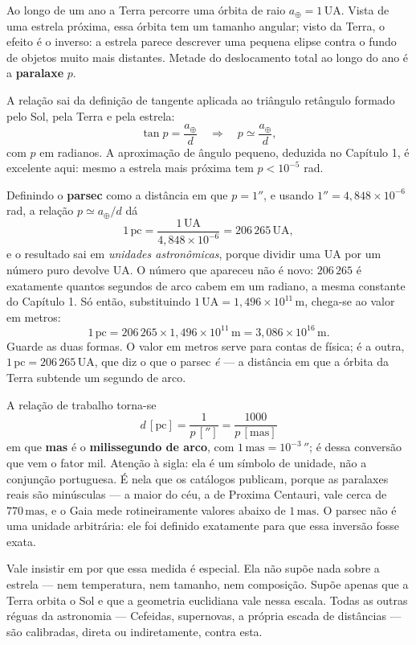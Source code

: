 \documentclass[11pt,a4paper]{article}
\begin{document}
Ao longo de um ano a Terra percorre uma órbita de raio $a_\oplus=1\,\mathrm{UA}$. Vista de uma estrela próxima, essa órbita tem um tamanho angular; visto da Terra, o efeito é o inverso: a estrela parece descrever uma pequena elipse contra o fundo de objetos muito mais distantes. Metade do deslocamento total ao longo do ano é a \textbf{paralaxe} $p$.

A relação sai da definição de tangente aplicada ao triângulo retângulo formado pelo Sol, pela Terra e pela estrela:
\[
\tan p=\frac{a_\oplus}{d}\quad\Longrightarrow\quad p\simeq\frac{a_\oplus}{d},
\]
com $p$ em radianos. A aproximação de ângulo pequeno, deduzida no Capítulo 1, é excelente aqui: mesmo a estrela mais próxima tem $p<10^{-5}$ rad.

Definindo o \textbf{parsec} como a distância em que $p=1''$, e usando $1''=4{,}848\times10^{-6}$ rad, a relação $p\simeq a_\oplus/d$ dá
\[
1\,\mathrm{pc}=\frac{1\,\mathrm{UA}}{4{,}848\times10^{-6}}=206\,265\,\mathrm{UA},
\]
e o resultado sai em \emph{unidades astronômicas}, porque dividir uma UA por um número puro devolve UA. O número que apareceu não é novo: $206\,265$ é exatamente quantos segundos de arco cabem em um radiano, a mesma constante do Capítulo 1. Só então, substituindo $1\,\mathrm{UA}=1{,}496\times10^{11}\,\mathrm{m}$, chega-se ao valor em metros:
\[
1\,\mathrm{pc}=206\,265\times1{,}496\times10^{11}\,\mathrm{m}=3{,}086\times10^{16}\,\mathrm{m}.
\]
Guarde as duas formas. O valor em metros serve para contas de física; é a outra, $1\,\mathrm{pc}=206\,265\,\mathrm{UA}$, que diz o que o parsec \emph{é} --- a distância em que a órbita da Terra subtende um segundo de arco.

A relação de trabalho torna-se
\[
\boxed{\ d\,[\mathrm{pc}]=\frac{1}{p\,['']}=\frac{1000}{p\,[\mathrm{mas}]}\ }
\]
em que \textbf{mas} é o \textbf{milissegundo de arco}, com $1\,\mathrm{mas}=10^{-3}\,''$; é dessa conversão que vem o fator mil. Atenção à sigla: ela é um símbolo de unidade, não a conjunção portuguesa. É nela que os catálogos publicam, porque as paralaxes reais são minúsculas --- a maior do céu, a de Proxima Centauri, vale cerca de $770\,\mathrm{mas}$, e o Gaia mede rotineiramente valores abaixo de $1\,\mathrm{mas}$. O parsec não é uma unidade arbitrária: ele foi definido exatamente para que essa inversão fosse exata.

Vale insistir em por que essa medida é especial. Ela não supõe nada sobre a estrela --- nem temperatura, nem tamanho, nem composição. Supõe apenas que a Terra orbita o Sol e que a geometria euclidiana vale nessa escala. Todas as outras réguas da astronomia --- Cefeidas, supernovas, a própria escada de distâncias --- são calibradas, direta ou indiretamente, contra esta.
\end{document}
